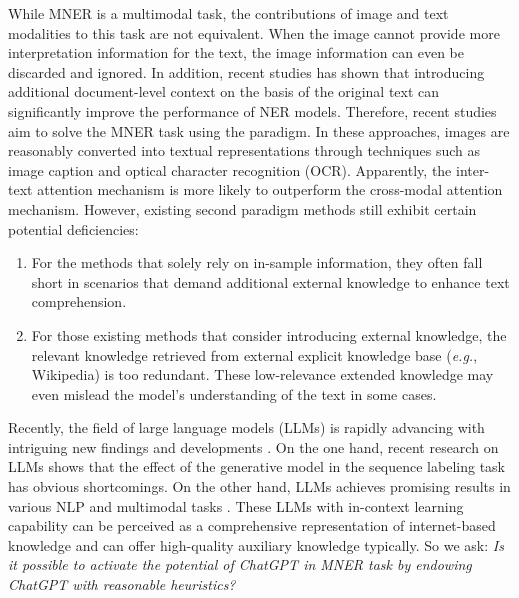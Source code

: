 \documentclass[11pt]{article}
\begin{document}
While MNER is a multimodal task, the contributions of image and text modalities to this task are not equivalent. 
When the image cannot provide more interpretation information for the text, the image information can even be discarded and ignored. 
In addition, recent studies \citep{wang2021improving,zhang2022domain} has shown that introducing additional document-level context on the basis of the original text can significantly improve the performance of NER models. Therefore, recent studies \citep{wang2021ita,wang2022named} aim to solve the MNER task using the  paradigm.
In these approaches, images are reasonably  converted into textual representations through techniques such as image caption and optical character recognition (OCR). Apparently, the inter-text attention mechanism is more likely to outperform the cross-modal attention mechanism. 
However, existing second paradigm methods still exhibit certain potential deficiencies:
\begin{enumerate}[label=(\roman*)]
    \vspace{-3pt}
    \item
    For the methods that solely rely on in-sample information, 
    they often fall short in scenarios that demand additional external knowledge to enhance text comprehension. 
    \vspace{-3pt}
    \item
    For those existing methods that consider introducing external knowledge, the relevant knowledge retrieved from external explicit knowledge base (\emph{e.g.}, Wikipedia) is too redundant. These low-relevance extended knowledge may even mislead the model's understanding of the text in some cases.
\end{enumerate}
\vspace{-3pt}

Recently, the field of large language models (LLMs) is rapidly advancing with intriguing new findings and developments \citep{brown2020language,touvron2023llama}. On the one hand, recent research on LLMs \citep{qin2023chatgpt,wei2023zero,wang2023gpt} shows that the effect of the generative model in the sequence labeling task has obvious shortcomings. On the other hand, LLMs achieves promising results in various NLP \citep{vilar2022prompting,moslem2023adaptive} and multimodal tasks \citep{yang2022empirical,shao2023prompting}. 
These LLMs with in-context learning capability can be perceived as a comprehensive representation of internet-based knowledge and can offer high-quality auxiliary knowledge typically.
So we ask: \emph{Is it possible to activate the potential of ChatGPT in MNER task by endowing ChatGPT with reasonable heuristics?} 
\end{document}
